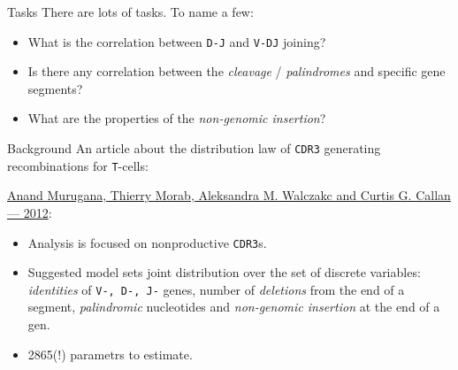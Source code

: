 \documentclass{beamer}\usepackage[]{graphicx}\usepackage[]{color}
\begin{document}
%  

\begin{frame}{Tasks}
  There are lots of tasks. To name a few:
  \begin{itemize}
    \item What is the correlation between \texttt{D-J} and \texttt{V-DJ} joining?
    \item Is there any correlation between the \textit{cleavage} / \textit{palindromes} and specific gene segments?  
    \item What are the properties of the \textit{non-genomic insertion}?
  \end{itemize}
\end{frame}

\begin{frame}{Background}
  An article about the distribution law of \texttt{CDR3} generating recombinations for \texttt{T}-cells:
  
  \href{http://www.pnas.org/content/109/40/16161.full}{%
  Anand Murugana, Thierry Morab, Aleksandra M. Walczakc and Curtis G. Callan --- 2012}:
  \begin{itemize}
    \item Analysis is focused on nonproductive \texttt{CDR3}s.
    \item Suggested model sets joint distribution over the set of discrete variables: \textit{identities} of \texttt{V-, D-, J-} genes, number of \textit{deletions} from the end of a segment, \textit{palindromic} nucleotides and \textit{non-genomic insertion} at the end of a gen.
    \pause
  \item {\color{blue} 2865(!) parametrs to estimate.}
  \end{itemize}
\end{frame}
\end{document}
